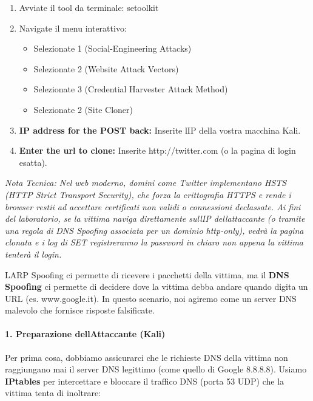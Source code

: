 \documentclass[11pt,a4paper]{article}
\begin{document}
\begin{enumerate}
\def\labelenumi{\arabic{enumi}.}
\item
  Avviate il tool da terminale: setoolkit
\item
  Navigate il menu interattivo:

  \begin{itemize}
  \item
    Selezionate 1 (Social-Engineering Attacks)
  \item
    Selezionate 2 (Website Attack Vectors)
  \item
    Selezionate 3 (Credential Harvester Attack Method)
  \item
    Selezionate 2 (Site Cloner)
  \end{itemize}
\item
  \textbf{IP address for the POST back:} Inserite l\textquotesingle IP
  della vostra macchina Kali.
\item
  \textbf{Enter the url to clone:} Inserite http://twitter.com (o la
  pagina di login esatta).
\end{enumerate}

\emph{Nota Tecnica: Nel web moderno, domini come Twitter implementano
HSTS (HTTP Strict Transport Security), che forza la crittografia HTTPS e
rende i browser restii ad accettare certificati non validi o connessioni
declassate. Ai fini del laboratorio, se la vittima naviga direttamente
sull\textquotesingle IP dell\textquotesingle attaccante (o tramite una
regola di DNS Spoofing associata per un dominio http-only), vedrà la
pagina clonata e i log di SET registreranno la password in chiaro non
appena la vittima tenterà il login.}

L\textquotesingle ARP Spoofing ci permette di ricevere i pacchetti della
vittima, ma il \textbf{DNS Spoofing} ci permette di decidere dove la
vittima debba andare quando digita un URL (es. www.google.it). In questo
scenario, noi agiremo come un server DNS malevolo che fornisce risposte
falsificate.

\paragraph{1. Preparazione dell\textquotesingle Attaccante
(Kali)}\label{preparazione-dellattaccante-kali}

Per prima cosa, dobbiamo assicurarci che le richieste DNS della vittima
non raggiungano mai il server DNS legittimo (come quello di Google
8.8.8.8). Usiamo \textbf{IPtables} per intercettare e bloccare il
traffico DNS (porta 53 UDP) che la vittima tenta di inoltrare:
\end{document}
